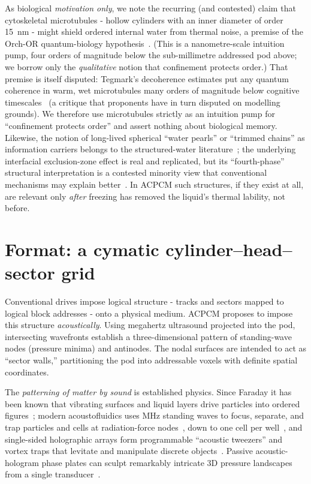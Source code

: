 \documentclass[11pt]{article}
\theoremstyle{definition}
\begin{document}
As biological \emph{motivation only}, we note the recurring (and contested) claim that
cytoskeletal microtubules - hollow cylinders with an inner diameter of order
\qty{15}{\nano\meter} - might shield ordered internal water from thermal noise, a premise of
the Orch-OR quantum-biology hypothesis~\cite{hameroff2014orchor}. (This is a nanometre-scale
intuition pump, four orders of magnitude below the sub-millimetre addressed pod above; we
borrow only the \emph{qualitative} notion that confinement protects order.) That premise is itself
disputed: Tegmark's decoherence estimates put any quantum coherence in warm, wet
microtubules many orders of magnitude below cognitive
timescales~\cite{tegmark2000decoherence} (a critique that proponents have in turn disputed
on modelling grounds). We therefore use microtubules strictly as an intuition pump for
``confinement protects order'' and assert nothing about biological memory. Likewise, the
notion of long-lived spherical ``water pearls'' or ``trimmed chains'' as information
carriers belongs to the structured-water literature~\cite{pollack2013fourth}; the
underlying interfacial exclusion-zone effect is real and replicated, but its
``fourth-phase'' structural interpretation is a contested minority view that conventional
mechanisms may explain better~\cite{elton2020ez}. In ACPCM such structures, if they exist
at all, are relevant only \emph{after} freezing has removed the liquid's thermal lability,
not before.

\section{Format: a cymatic cylinder--head--sector grid}
\label{sec:format}

Conventional drives impose logical structure - tracks and sectors mapped to logical block
addresses - onto a physical medium. ACPCM proposes to impose this structure
\emph{acoustically}. Using megahertz ultrasound projected into the pod, intersecting
wavefronts establish a three-dimensional pattern of standing-wave nodes (pressure minima)
and antinodes. The nodal surfaces are intended to act as ``sector walls,'' partitioning the
pod into addressable voxels with definite spatial coordinates.

The \emph{patterning of matter by sound} is established physics. Since Faraday it has been
known that vibrating surfaces and liquid layers drive particles into ordered
figures~\cite{faraday1831}; modern acoustofluidics uses MHz standing waves to focus,
separate, and trap particles and cells at radiation-force nodes~\cite{rufo2022acoustofluidics},
down to one cell per well~\cite{collins2015saw}, and single-sided holographic arrays form
programmable ``acoustic tweezers'' and vortex traps that levitate and manipulate discrete
objects~\cite{marzo2015holographic,marzo2018vortices}. Passive acoustic-hologram phase
plates can sculpt remarkably intricate 3D pressure landscapes from a single
transducer~\cite{melde2016holograms,memoli2017bricks}.
\end{document}
